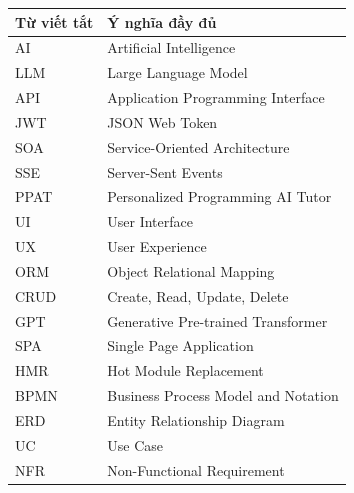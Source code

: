 \documentclass[../main.tex]{subfiles}
\begin{document}
{
\renewcommand{\arraystretch}{1.5}
\begin{tabularx}{\textwidth}{|p{3.5cm}|X|}
\hline
\textbf{Từ viết tắt} & \textbf{Ý nghĩa đầy đủ} \\
\hline
AI & Artificial Intelligence \\
\hline
LLM & Large Language Model \\
\hline
API & Application Programming Interface \\
\hline
JWT & JSON Web Token \\
\hline
SOA & Service-Oriented Architecture \\
\hline
SSE & Server-Sent Events \\
\hline
PPAT & Personalized Programming AI Tutor \\
\hline
UI & User Interface \\
\hline
UX & User Experience \\
\hline
ORM & Object Relational Mapping \\
\hline
CRUD & Create, Read, Update, Delete \\
\hline
GPT & Generative Pre-trained Transformer \\
\hline
SPA & Single Page Application \\
\hline
HMR & Hot Module Replacement \\
\hline
BPMN & Business Process Model and Notation \\
\hline
ERD & Entity Relationship Diagram \\
\hline
UC & Use Case \\
\hline
NFR & Non-Functional Requirement \\
\hline
\end{tabularx}
}
\end{document}
